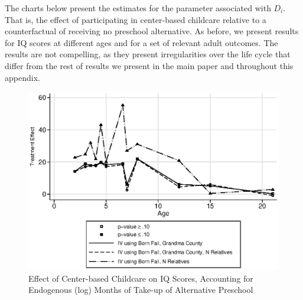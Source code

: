\begin{appendices}
\noindent The charts below present the estimates for the parameter associated with $D_i$. That is, the effect of participating in center-based childcare relative to a counterfactual of receiving no preschool alternative. As before, we present results for IQ scores at different ages and for a set of relevant adult outcomes. The results are not compelling, as they present irregularities over the life cycle that differ from the rest of results we present in the main paper and throughout this appendix. 

\begin{figure}[H]
		\caption{Effect of Center-based Childcare on IQ Scores, Accounting for Endogenous (log) Months of Take-up of Alternative Preschool} \label{output/appendixplots/Q_cf_te.eps}
		\includegraphics[width=.7\columnwidth]{output/appendixplots/ins_inter_logQ_iv_te.eps}
\end{figure}


\end{appendices}
